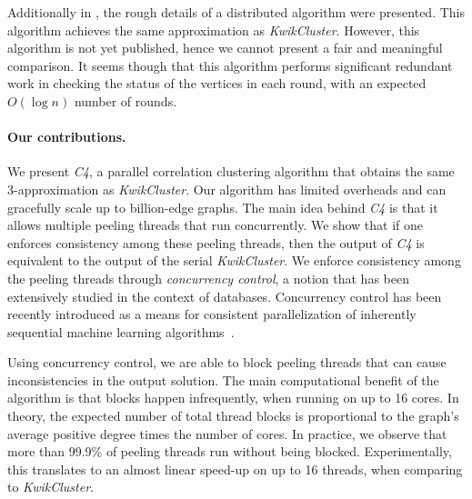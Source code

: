 \documentclass{article} %
\begin{document}
Additionally in \cite{bonchi2014correlation}, the rough details of a distributed algorithm were presented.
This algorithm achieves the same approximation as {\it{KwikCluster}}.
However, this algorithm is not yet published, hence we cannot present a fair and meaningful comparison.
It seems though that this algorithm performs significant redundant work in checking the status of the vertices in each round, with an expected $O(\log n)$ number of rounds.



\paragraph{Our contributions.} 
We present {\it{C4}}, a parallel correlation clustering algorithm that obtains the same 3-approximation as {\it{KwikCluster}}.
Our algorithm has limited overheads and can gracefully scale up to billion-edge graphs.
The main idea behind {\it{C4}} is that it allows multiple  peeling  threads that run concurrently.
We show that if one enforces consistency among these peeling threads, then the output of {\it{C4}} is equivalent to the output of the serial {\it{KwikCluster}}.
We enforce consistency among the peeling threads through {\it concurrency control}, a notion that has been extensively studied in the context of databases.
Concurrency control has been recently introduced as a means for consistent parallelization of inherently sequential machine learning algorithms~\cite{pan2013optimistic}.

Using concurrency control, we are able to block peeling threads that can cause inconsistencies in the output solution.
The main computational benefit of the algorithm is that blocks happen infrequently, when running on up to 16 cores.
In theory, the expected number of total thread blocks is proportional to the graph's average positive degree times the number of cores.
In practice, we observe that more than 99.9\% of peeling threads run without being blocked.
Experimentally, this translates to an almost linear speed-up on up to 16 threads, when comparing to {\it{KwikCluster}}.
\end{document}
